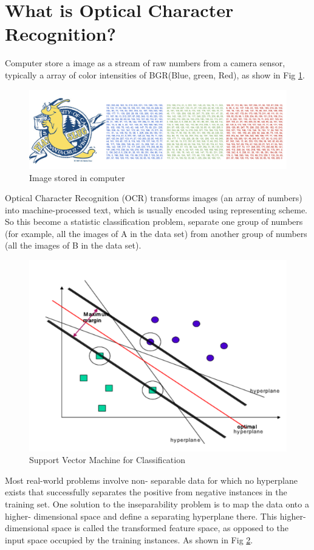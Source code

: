\documentclass[11pt]{ucscthesis}
\begin{document}
\section{What is Optical Character Recognition?}
Computer store a image as a stream of raw numbers from a camera sensor, typically a array of color intensities of BGR(Blue, green, Red), as show in Fig \ref{Image}. 


\begin{figure}
    \centering
    \includegraphics[width =0.8\linewidth]{Fig/image.png}
    \caption{Image stored in computer}
    \label{Image}
\end{figure}


Optical Character Recognition (OCR) transforms images (an array of numbers) into machine-processed text, which is usually encoded using representing scheme. So this become a statistic classification problem\cite{kotsiantis2006machine}\cite{kotsiantis2007supervised}\cite{nickel2015review}, separate one group of numbers (for example, all the images of A in the data set) from another group of numbers (all the images of B in the data set).  
\begin{figure}
    \centering
    \includegraphics[width =0.5\linewidth]{Fig/SVM.png}
    \caption{Support Vector Machine for Classification\cite{kotsiantis2006machine}}
    \label{SVM}
\end{figure}

Most real-world problems involve non- separable data for which no hyperplane exists that successfully separates the positive from negative instances in the training set. One solution to the inseparability problem is to map the data onto a higher- dimensional space and define a separating hyperplane there. This higher-dimensional space is called the transformed feature space, as opposed to the input space occupied by the training instances. As shown in Fig \ref{SVM}.
\end{document}

